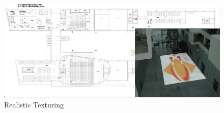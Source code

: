 \begin{figure}[h!]
	\centering
	\includegraphics[width=\textwidth]{Handin2/images/realistictexturing.png}
	\caption{Realistic Texturing}
	\label{fig:realistictexturing}
\end{figure}
